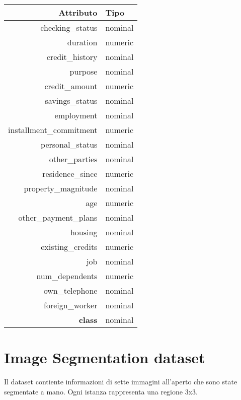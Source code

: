 \begin{table}[!htb]
	\centering
	\begin{tabular}{|r|l|}
		\hline
		Attributo & Tipo \\ 
		\hline
		checking\_status & nominal \\ 
		duration & numeric \\ 
		credit\_history & nominal \\ 
		purpose & nominal \\ 
		credit\_amount & numeric \\ 
		savings\_status & nominal \\ 
		employment & nominal \\ 
		installment\_commitment & numeric \\ 
		personal\_status & nominal \\ 
		other\_parties & nominal \\ 
		residence\_since & numeric \\ 
		property\_magnitude & nominal \\ 
		age & numeric \\ 
		other\_payment\_plans & nominal \\ 
		housing & nominal \\ 
		existing\_credits & numeric \\ 
		job & nominal \\ 
		num\_dependents & numeric \\ 
		own\_telephone & nominal \\ 
		foreign\_worker & nominal \\ 
		\textbf{class} & nominal \\ 
		\hline
	\end{tabular}
\end{table}

\pagebreak 

\section{Image Segmentation dataset}

Il dataset contiente informazioni di sette immagini all'aperto che sono state segmentate a mano. Ogni istanza rappresenta una regione 3x3.


